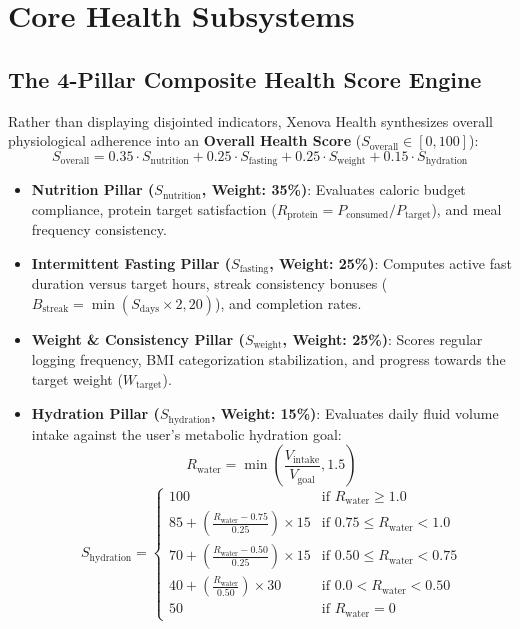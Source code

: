 \documentclass[12pt,a4paper]{article}
\begin{document}
\section{Core Health Subsystems}

\subsection{The 4-Pillar Composite Health Score Engine}
Rather than displaying disjointed indicators, Xenova Health synthesizes overall physiological adherence into an \textbf{Overall Health Score} ($S_{\text{overall}} \in [0, 100]$):
\begin{equation}
S_{\text{overall}} = 0.35 \cdot S_{\text{nutrition}} + 0.25 \cdot S_{\text{fasting}} + 0.25 \cdot S_{\text{weight}} + 0.15 \cdot S_{\text{hydration}}
\end{equation}

\begin{itemize}[leftmargin=1.5em]
    \item \textbf{Nutrition Pillar ($S_{\text{nutrition}}$, Weight: 35\%)}: Evaluates caloric budget compliance, protein target satisfaction ($R_{\text{protein}} = P_{\text{consumed}} / P_{\text{target}}$), and meal frequency consistency.
    \item \textbf{Intermittent Fasting Pillar ($S_{\text{fasting}}$, Weight: 25\%)}: Computes active fast duration versus target hours, streak consistency bonuses ($B_{\text{streak}} = \min(S_{\text{days}} \times 2, 20)$), and completion rates.
    \item \textbf{Weight \& Consistency Pillar ($S_{\text{weight}}$, Weight: 25\%)}: Scores regular logging frequency, BMI categorization stabilization, and progress towards the target weight ($W_{\text{target}}$).
    \item \textbf{Hydration Pillar ($S_{\text{hydration}}$, Weight: 15\%)}: Evaluates daily fluid volume intake against the user's metabolic hydration goal:
    \begin{equation}
    R_{\text{water}} = \min\left(\frac{V_{\text{intake}}}{V_{\text{goal}}}, 1.5\right)
    \end{equation}
    \begin{equation}
    S_{\text{hydration}} = 
    \begin{cases} 
      100 & \text{if } R_{\text{water}} \ge 1.0 \\
      85 + \left(\frac{R_{\text{water}} - 0.75}{0.25}\right) \times 15 & \text{if } 0.75 \le R_{\text{water}} < 1.0 \\
      70 + \left(\frac{R_{\text{water}} - 0.50}{0.25}\right) \times 15 & \text{if } 0.50 \le R_{\text{water}} < 0.75 \\
      40 + \left(\frac{R_{\text{water}}}{0.50}\right) \times 30 & \text{if } 0.0 < R_{\text{water}} < 0.50 \\
      50 & \text{if } R_{\text{water}} = 0
    \end{cases}
    \end{equation}
\end{itemize}
\end{document}
